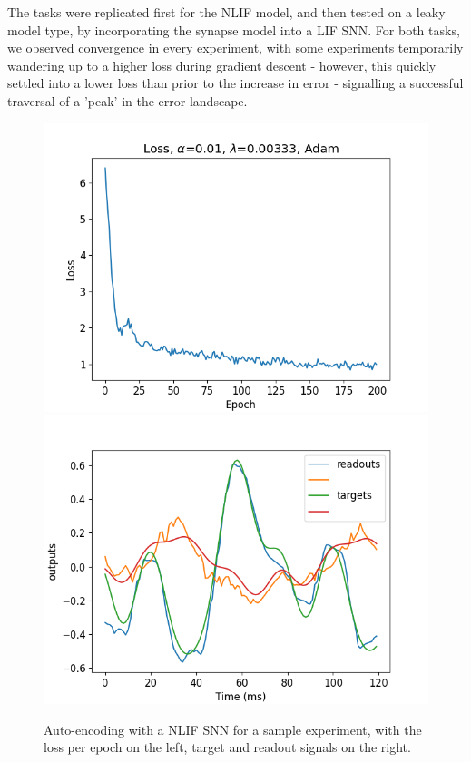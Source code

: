 \documentclass[mphil,deptreport,ianc]{infthesis} %
\begin{document}
The tasks were replicated first for the NLIF model, and then tested on a leaky model type, by incorporating the synapse model into a LIF SNN.
For both tasks, we observed convergence in every experiment, with some experiments temporarily wandering up to a higher loss during gradient descent - however, this quickly settled into a lower loss than prior to the increase in error - signalling a successful traversal of a 'peak' in the error landscape.


\begin{figure}
    \centering
    \includegraphics[width=0.49\columnwidth]{figures/Gating/AutoEncoding/NLIF_sample/plot_loss_test_mt_NLIF_et_AutoEncoding_N_30_titers_200.png}
    \includegraphics[width=0.49\columnwidth]{figures/Gating/AutoEncoding/NLIF_sample/test_plot_outputs_NLIF_seed_23.png}
    \caption{Auto-encoding with a NLIF SNN for a sample experiment, with the loss per epoch on the left, target and readout signals on the right.}
    \label{fig:autoencoding_NLIF}
\end{figure}
\end{document}
